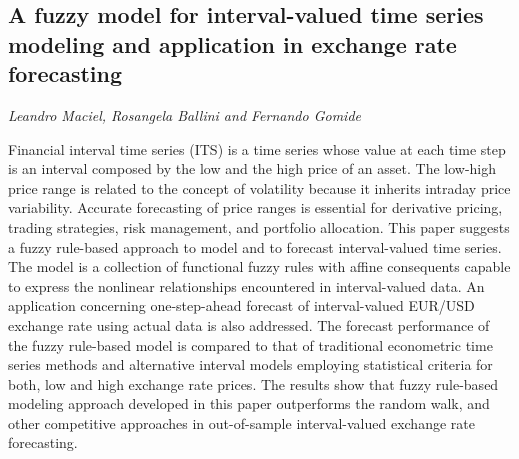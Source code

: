 \documentclass[../booklet.tex]{subfiles}
\begin{document}
\subsection[A fuzzy model for interval-valued time series modeling and application in exchange rate forecasting. {\it Leandro Maciel, Rosangela Ballini and Fernando Gomide}]{A fuzzy model for interval-valued time series modeling and application in exchange rate forecasting}
  

\begin{center}
  {\it Leandro Maciel, Rosangela Ballini and Fernando Gomide}
\end{center}

\vskip 0.8cm

 Financial interval time series (ITS) is a time series whose value at each time step is an interval composed by the low and the high price of an asset. The low-high price range is related to the concept of volatility because it inherits intraday price variability. Accurate forecasting of price ranges is essential for derivative pricing, trading strategies, risk management, and portfolio allocation. This paper suggests a fuzzy rule-based approach to model and to forecast interval-valued time series. The model is a collection of functional fuzzy rules with affine consequents capable to express the nonlinear relationships encountered in interval-valued data. An application concerning one-step-ahead forecast of interval-valued EUR/USD exchange rate using actual data is also addressed.  The forecast performance of the fuzzy rule-based model is compared to that of traditional econometric time series methods and alternative interval models employing statistical criteria for both, low and high exchange rate prices. The results show that fuzzy rule-based modeling approach developed in this paper outperforms the random walk, and other competitive approaches in out-of-sample interval-valued exchange rate forecasting.

\end{document}
